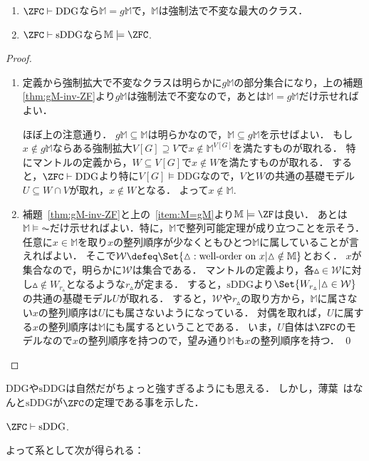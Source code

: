 \documentclass[a4j,leqno]{ltjsarticle}
\newcommand{\mantle}{\mathbb{M}}
\newcommand{\M}{\mantle}
\newcommand{\gM}{g\mathbb{M}}
\newcommand{\DDG}{\mathord{\mathrm{DDG}}}
\newcommand{\sDDG}{\mathord{\mathrm{sDDG}}}
\begin{document}
\begin{theorem}[F--H--R]
 \begin{enumerate}
  \item\label{item:M=gM} $\ZFC \vdash \DDG$なら$\M = \gM$で，$\M$は強制法で不変な最大のクラス．
  \item\label{item:M|=ZFC} $\ZFC \vdash \sDDG$なら$\M \models \ZFC$.
 \end{enumerate}
\end{theorem}
\begin{proof}
 \begin{enumerate}
  \item 定義から強制拡大で不変なクラスは明らかに$\gM$の部分集合になり，上の補題\ref{thm:gM-inv-ZF}より$\gM$は強制法で不変なので，あとは$\M = \gM$だけ示せればよい．

        ほぼ上の注意通り．
        $\gM \subseteq \M$は明らかなので，$\M \subseteq \gM$を示せばよい．
        もし$x \notin \gM$ならある強制拡大$V[G] \supseteq V$で$x \notin \M^{V[G]}$を満たすものが取れる．
        特にマントルの定義から，$W \subseteq V[G]$で$x \notin W$を満たすものが取れる．
        すると，$\ZFC \vdash \DDG$より特に$V[G] \models \DDG$なので，$V$と$W$の共通の基礎モデル$U \subseteq W \cap V$が取れ，$x \notin W$となる．
        よって$x \notin \M$.
  \item 補題~\ref{thm:gM-inv-ZF}と上の~\ref{item:M=gM}より$\M \models \ZF$は良い．
        あとは$\M \models \AC$だけ示せればよい．特に，$\M$で整列可能定理が成り立つことを示そう．
        任意に$x \in \M$を取り$x$の整列順序が少なくともひとつ$\M$に属していることが言えればよい．
        そこで$\mathcal{W} \defeq \Set{ {\vartriangle} : \text{well-order on } x | {\vartriangle} \notin \M}$とおく．
        $x$が集合なので，明らかに$\mathcal{W}$は集合である．
        マントルの定義より，各${\vartriangle} \in \mathcal{W}$に対し${\vartriangle} \notin W_{r_{\vartriangle}}$となるような$r_{\vartriangle}$が定まる．
        すると，$\sDDG$より$\Set{W_{r_{\vartriangle}} | {\vartriangle} \in \mathcal{W}}$の共通の基礎モデル$U$が取れる．
        すると，$\mathcal{W}$や$r_{\vartriangle}$の取り方から，$\M$に属さない$x$の整列順序は$U$にも属さないようになっている．
        対偶を取れば，$U$に属する$x$の整列順序は$\M$にも属するということである．
        いま，$U$自体は$\ZFC$のモデルなので$x$の整列順序を持つので，望み通り$\M$も$x$の整列順序を持つ． \qed
 \end{enumerate} 
\end{proof}

$\DDG$や$\sDDG$は自然だがちょっと強すぎるようにも思える．
しかし，薄葉~\cite{Usuba:2017fp}はなんと$\sDDG$が$\ZFC$の定理である事を示した．
\begin{theorem}
 $\ZFC \vdash \sDDG$.
\end{theorem}
よって系として次が得られる：
\end{document}
